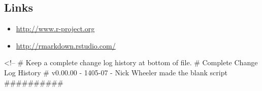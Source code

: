 \documentclass[]{article}
\providecommand{\tightlist}{%
  \setlength{\itemsep}{0pt}\setlength{\parskip}{0pt}}
\begin{document}
\hypertarget{links}{%
\subsection{Links}\label{links}}

\begin{itemize}
\tightlist
\item
  \url{http://www.r-project.org}
\item
  \url{http://rmarkdown.rstudio.com/}
\end{itemize}

\textless{}!-- \# Keep a complete change log history at bottom of file.
\# Complete Change Log History \# v0.00.00 - 1405-07 - Nick Wheeler made
the blank script \#\#\#\#\#\#\#\#\#\#
\end{document}

